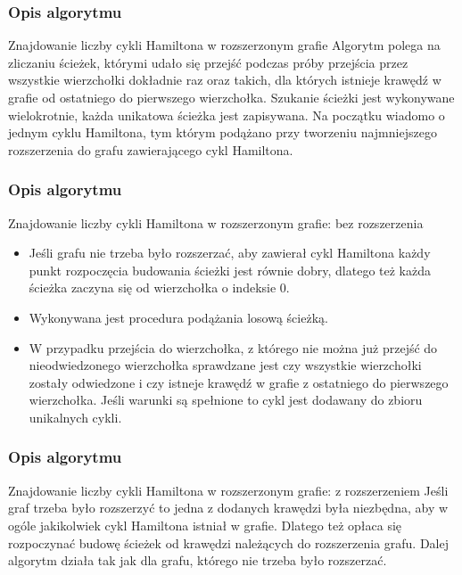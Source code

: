 \documentclass{beamer}
\begin{document}
\begin{frame}
\frametitle{Opis algorytmu}
\begin{block}{Znajdowanie liczby cykli Hamiltona w rozszerzonym grafie}
\justifying
Algorytm polega na zliczaniu ścieżek, którymi udało się przejść podczas próby przejścia przez wszystkie wierzchołki dokładnie raz oraz takich, dla których istnieje krawędź w grafie od ostatniego do pierwszego wierzchołka. Szukanie ścieżki jest wykonywane wielokrotnie, każda unikatowa ścieżka jest zapisywana. Na początku wiadomo o jednym cyklu Hamiltona, tym którym podążano przy tworzeniu najmniejszego rozszerzenia do grafu zawierającego cykl Hamiltona.
\end{block}
\end{frame}

\begin{frame}
\frametitle{Opis algorytmu}
\begin{block}{Znajdowanie liczby cykli Hamiltona w rozszerzonym grafie: bez rozszerzenia}
\justifying
\begin{itemize}
    \item Jeśli grafu nie trzeba było rozszerzać, aby zawierał cykl Hamiltona każdy punkt rozpoczęcia budowania ścieżki jest równie dobry, dlatego też każda ścieżka zaczyna się od wierzchołka o indeksie 0. \\
    \item Wykonywana jest procedura podążania losową ścieżką. \\
    \item W przypadku przejścia do wierzchołka, z którego nie można już przejść do nieodwiedzonego wierzchołka sprawdzane jest czy wszystkie wierzchołki zostały odwiedzone i czy istneje krawędź w grafie z ostatniego do pierwszego wierzchołka. Jeśli warunki są spełnione to cykl jest dodawany do zbioru unikalnych cykli. \\
\end{itemize}
\end{block}
\end{frame}

\begin{frame}
\frametitle{Opis algorytmu}
\begin{block}{Znajdowanie liczby cykli Hamiltona w rozszerzonym grafie: z rozszerzeniem}
\justifying
Jeśli graf trzeba było rozszerzyć to jedna z dodanych krawędzi była niezbędna, aby w ogóle jakikolwiek cykl Hamiltona istniał w grafie. Dlatego też opłaca się rozpoczynać budowę ścieżek od krawędzi należących do rozszerzenia grafu. Dalej algorytm działa tak jak dla grafu, którego nie trzeba było rozszerzać.
\end{block}
\end{frame}
\end{document}
